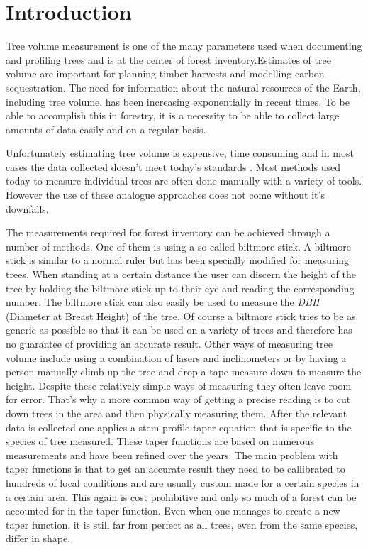 

\newcommand{\degree}{$^\circ$}

\section{Introduction}
Tree volume measurement is one of the many parameters used when documenting and profiling trees and is at the center of forest inventory.Estimates of tree volume are important for planning timber harvests and modelling carbon sequestration. The need for information about the natural resources of the Earth, including tree volume, has been increasing exponentially in recent times. To be able to accomplish this in forestry, it is a necessity to be able to collect large amounts of data easily and on a regular basis. 

Unfortunately estimating tree volume is expensive, time consuming and in most cases the data collected doesn't meet today's standards \cite{digital imaged based tree measurement for forest inventory}.
Most methods used today to measure individual trees are often done manually with a variety of tools. However the use of these analogue approaches does not come without it's downfalls.

The measurements required for forest inventory can be achieved through a number of methods. One of them is using a so called biltmore stick. A biltmore stick is similar to a normal ruler but has been specially modified for measuring trees. When standing at a certain distance the user can discern the height of the tree by holding the biltmore stick up to their eye and reading the corresponding number. The biltmore stick can also easily be used to measure the \emph{DBH} (Diameter at Breast Height) of the tree. Of course a biltmore stick tries to be as generic as possible so that it can be used on a variety of trees and therefore has no guarantee of providing an accurate result. Other ways of measuring tree volume include using a combination of lasers and inclinometers or by having a person manually climb up the tree and drop a tape measure down to measure the height. Despite these relatively simple ways of measuring they often leave room for error. That’s why a more common way of getting a precise reading is to cut down trees in the area and then physically measuring them. After the relevant data is collected one applies a stem-profile taper equation that is specific to the species of tree measured. These taper functions are based on numerous measurements and have been refined over the years. The main problem with taper functions is that to get an accurate result they need to be callibrated to hundreds of local conditions and are usually custom made for a certain species in a certain area. This again is cost prohibitive and only so much of a forest can be accounted for in the taper function. Even when one manages to create a new taper function, it is still far from perfect as all trees, even from the same species, differ in shape.

